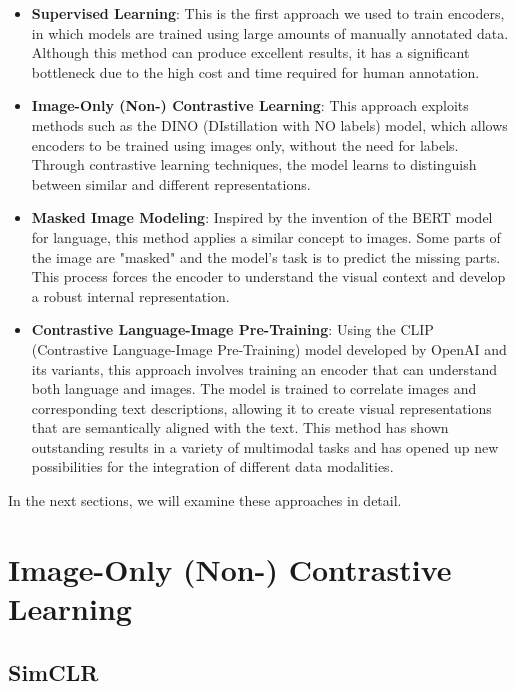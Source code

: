 \begin{itemize}
    \item \textbf{Supervised Learning}: This is the first approach we used to train encoders, in which models are trained using large amounts of manually annotated data. Although this method can produce excellent results, it has a significant bottleneck due to the high cost and time required for human annotation.
    
    \item \textbf{Image-Only (Non-) Contrastive Learning}: This approach exploits methods such as the DINO (DIstillation with NO labels) model, which allows encoders to be trained using images only, without the need for labels. Through contrastive learning techniques, the model learns to distinguish between similar and different representations.
    
    \item \textbf{Masked Image Modeling}: Inspired by the invention of the BERT model for language, this method applies a similar concept to images. Some parts of the image are "masked" and the model's task is to predict the missing parts. This process forces the encoder to understand the visual context and develop a robust internal representation.
    
    \item \textbf{Contrastive Language-Image Pre-Training}: Using the CLIP (Contrastive Language-Image Pre-Training) model developed by OpenAI and its variants, this approach involves training an encoder that can understand both language and images. The model is trained to correlate images and corresponding text descriptions, allowing it to create visual representations that are semantically aligned with the text. This method has shown outstanding results in a variety of multimodal tasks and has opened up new possibilities for the integration of different data modalities.
\end{itemize}

In the next sections, we will examine these approaches in detail.

\section{Image-Only (Non-) Contrastive Learning}

\subsection{SimCLR}


